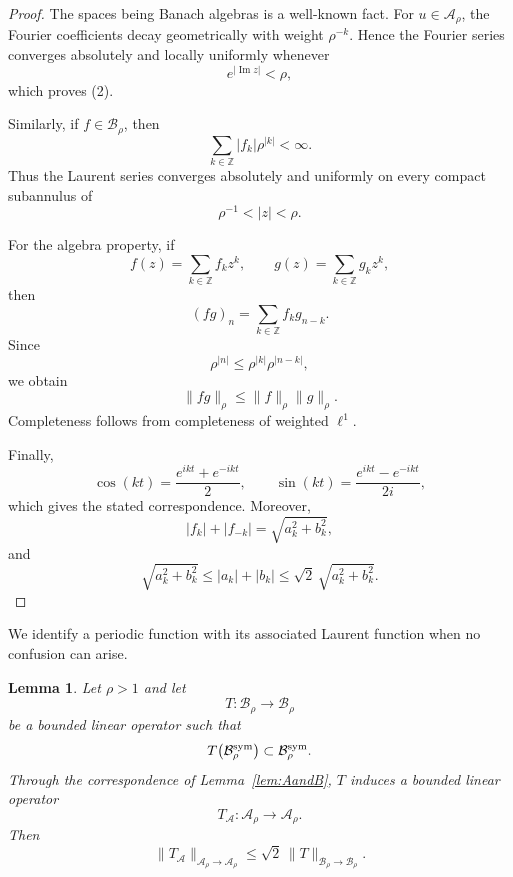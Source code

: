 \documentclass[11pt,a4paper]{amsart}
\newtheorem{lemma}[theorem]{Lemma}
\begin{document}
\begin{proof}
	The spaces being Banach algebras is a well-known fact.
	For $u\in\mathcal A_\rho$, the Fourier coefficients decay
	geometrically with weight $\rho^{-k}$. Hence the Fourier series
	converges absolutely and locally uniformly whenever
	\[
	e^{|\operatorname{Im}z|}<\rho,
	\]
	which proves (2).
	
	Similarly, if $f\in\mathcal B_\rho$, then
	\[
	\sum_{k\in\mathbb Z}|f_k|\rho^{|k|}<\infty.
	\]
	Thus the Laurent series converges absolutely and uniformly on every
	compact subannulus of
	\[
	\rho^{-1}<|z|<\rho.
	\]
	
	For the algebra property, if
	\[
	f(z)=\sum_{k\in\mathbb Z}f_kz^k,
	\qquad
	g(z)=\sum_{k\in\mathbb Z}g_kz^k,
	\]
	then
	\[
	(fg)_n
	=
	\sum_{k\in\mathbb Z}f_kg_{n-k}.
	\]
	Since
	\[
	\rho^{|n|}
	\le
	\rho^{|k|}\rho^{|n-k|},
	\]
	we obtain
	\[
	\|fg\|_\rho
	\le
	\|f\|_\rho\|g\|_\rho.
	\]
	Completeness follows from completeness of weighted $\ell^1$.
	
	Finally,
	\[
	\cos(kt)=\frac{e^{ikt}+e^{-ikt}}2,
	\qquad
	\sin(kt)=\frac{e^{ikt}-e^{-ikt}}{2i},
	\]
	which gives the stated correspondence. Moreover,
	\[
	|f_k|+|f_{-k}|
	=
	\sqrt{a_k^2+b_k^2},
	\]
	and
	\[
	\sqrt{a_k^2+b_k^2}
	\le
	|a_k|+|b_k|
	\le
	\sqrt2\,\sqrt{a_k^2+b_k^2}.
	\]
\end{proof}
We identify a periodic function with its associated Laurent function when no confusion can arise.
\begin{lemma}\label{lem:operator-A-B}
	Let $\rho>1$ and let
	\[
	T:\mathcal B_\rho\longrightarrow\mathcal B_\rho
	\]
	be a bounded linear operator such that
	\[
	T\bigl(\mathcal B_\rho^{\rm sym}\bigr)
	\subset
	\mathcal B_\rho^{\rm sym}.
	\]
	Through the correspondence of Lemma~\ref{lem:AandB}, $T$ induces
	a bounded linear operator
	\[
	T_{\mathcal A}:\mathcal A_\rho\longrightarrow\mathcal A_\rho.
	\]
	Then
	\begin{equation}\label{eq:operator-A-B}
		\|T_{\mathcal A}\|_{\mathcal A_\rho\to\mathcal A_\rho}
		\le
		\sqrt2\,
		\|T\|_{\mathcal B_\rho\to\mathcal B_\rho}.
	\end{equation}
\end{lemma}
\end{document}
